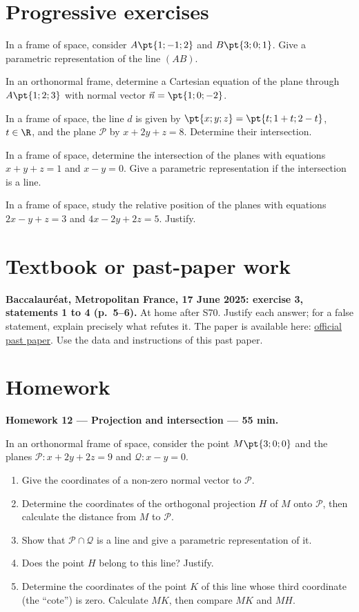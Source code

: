 \mxnewpage
\section{Progressive exercises}

In a frame of space, consider $A\pt{1;-1;2}$ and $B\pt{3;0;1}$. Give a parametric representation of the line $(AB)$.

In an orthonormal frame, determine a Cartesian equation of the plane through $A\pt{1;2;3}$ with normal vector $\vec n=\pt{1;0;-2}$.

In a frame of space, the line $d$ is given by $\pt{x;y;z}=\pt{t;1+t;2-t}$, $t\in\R$, and the plane $\mathcal P$ by $x+2y+z=8$. Determine their intersection.

In a frame of space, determine the intersection of the planes with equations $x+y+z=1$ and $x-y=0$. Give a parametric representation if the intersection is a line.

In a frame of space, study the relative position of the planes with equations $2x-y+z=3$ and $4x-2y+2z=5$. Justify.

\section{Textbook or past-paper work}\textbf{Baccalauréat, Metropolitan France, 17 June 2025: exercise 3, statements 1 to 4 (p.~5--6).} At home after S70. Justify each answer; for a false statement, explain precisely what refutes it. The paper is available here: \href{https://www.education.gouv.fr/sites/default/files/2025-06/baccalaur-at-g-n-ral-2025-math-matiques-440856.pdf}{official past paper}. Use the data and instructions of this past paper.

\mxnewpage
\section{Homework}\textbf{Homework 12 --- Projection and intersection --- 55 min.}\par In an orthonormal frame of space, consider the point $M\pt{3;0;0}$ and the planes $\mathcal P:x+2y+2z=9$ and $\mathcal Q:x-y=0$.
\begin{enumerate}\item Give the coordinates of a non-zero normal vector to $\mathcal P$.
\item Determine the coordinates of the orthogonal projection $H$ of $M$ onto $\mathcal P$, then calculate the distance from $M$ to $\mathcal P$.
\item Show that $\mathcal P\cap\mathcal Q$ is a line and give a parametric representation of it.
\item Does the point $H$ belong to this line? Justify.
\item Determine the coordinates of the point $K$ of this line whose third coordinate (the ``cote'') is zero. Calculate $MK$, then compare $MK$ and $MH$.\end{enumerate}

